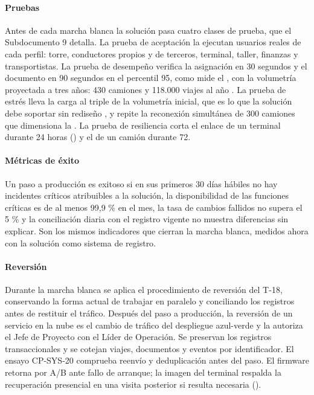 \paragraph{Pruebas}
Antes de cada marcha blanca la solución pasa cuatro clases de prueba, que el Subdocumento 9 detalla. La
prueba de aceptación la ejecutan usuarios reales de cada perfil: torre, conductores propios y de
terceros, terminal, taller, finanzas y transportistas. La prueba de desempeño verifica la asignación en
30 segundos y el documento en 90 segundos en el percentil 95, como mide el , con la
volumetría proyectada a tres años: 430 camiones y 118.000 viajes al año . La
prueba de estrés lleva la carga al triple de la volumetría inicial, que es lo que la solución debe
soportar sin rediseño , y repite la reconexión simultánea de 300 camiones que
dimensiona la . La prueba de resiliencia corta el enlace de un terminal
durante 24 horas () y el de un camión durante 72.

\paragraph{Métricas de éxito}
Un paso a producción es exitoso si en sus primeros 30 días hábiles no hay incidentes críticos atribuibles
a la solución, la disponibilidad de las funciones críticas es de al menos 99,9 \% en el mes, la tasa de
cambios fallidos no supera el 5 \%  y la conciliación diaria con el registro vigente no
muestra diferencias sin explicar. Son los mismos indicadores que cierran la marcha blanca, medidos ahora
con la solución como sistema de registro.

\paragraph{Reversión}
Durante la marcha blanca se aplica el procedimiento de reversión del T-18, conservando la forma actual de trabajar en paralelo y conciliando los registros antes de restituir el tráfico. Después del paso a producción, la reversión de un servicio en la nube es el cambio
de tráfico del despliegue azul-verde y la autoriza el Jefe de Proyecto con el Líder de Operación. Se preservan los registros transaccionales y se cotejan viajes, documentos y eventos por identificador. El ensayo CP-SYS-20 comprueba reenvío y deduplicación antes del paso. El firmware retorna por A/B ante fallo de arranque; la imagen del terminal respalda la recuperación presencial en una visita posterior si resulta necesaria ().


